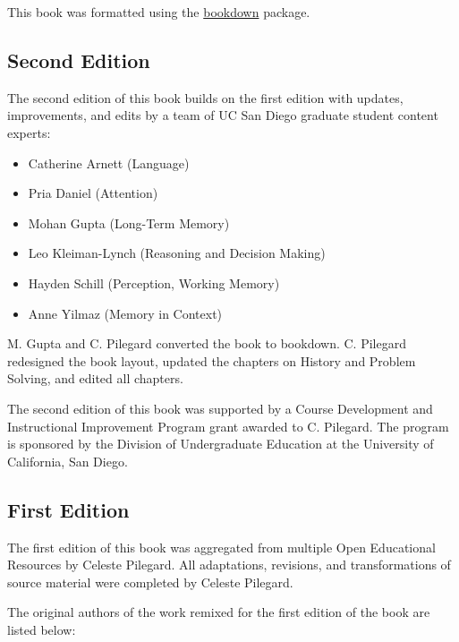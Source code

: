 \documentclass[
]{krantz}
\providecommand{\tightlist}{%
  \setlength{\itemsep}{0pt}\setlength{\parskip}{0pt}}
\begin{document}
This book was formatted using the \href{https://bookdown.org/}{bookdown} package.

\hypertarget{second-edition}{%
\subsection*{Second Edition}\label{second-edition}}


The second edition of this book builds on the first edition with updates, improvements, and edits by a team of UC San Diego graduate student content experts:

\begin{itemize}
\tightlist
\item
  Catherine Arnett (Language)
\item
  Pria Daniel (Attention)
\item
  Mohan Gupta (Long-Term Memory)
\item
  Leo Kleiman-Lynch (Reasoning and Decision Making)
\item
  Hayden Schill (Perception, Working Memory)
\item
  Anne Yilmaz (Memory in Context)
\end{itemize}

M. Gupta and C. Pilegard converted the book to bookdown. C. Pilegard redesigned the book layout, updated the chapters on History and Problem Solving, and edited all chapters.

The second edition of this book was supported by a Course Development and Instructional Improvement Program grant awarded to C. Pilegard. The program is sponsored by the Division of Undergraduate Education at the University of California, San Diego.

\hypertarget{first-edition}{%
\subsection*{First Edition}\label{first-edition}}


The first edition of this book was aggregated from multiple Open Educational Resources by Celeste Pilegard. All adaptations, revisions, and transformations of source material were completed by Celeste Pilegard.

The original authors of the work remixed for the first edition of the book are listed below:
\end{document}
